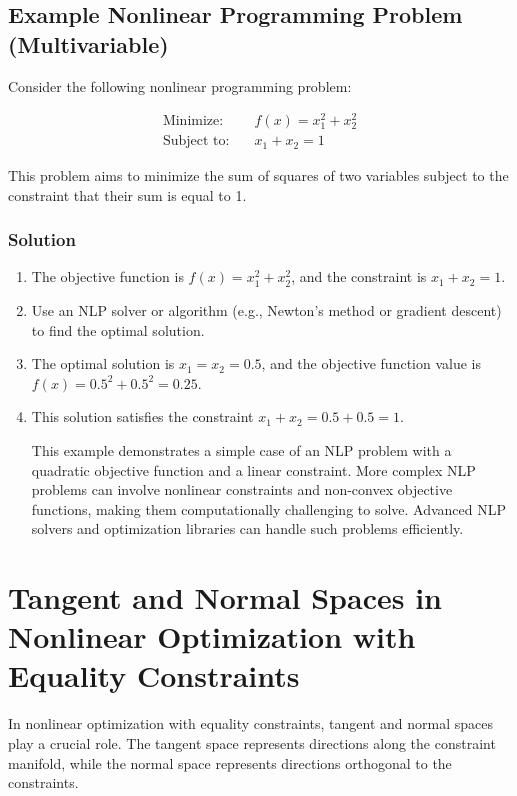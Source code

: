 \documentclass[a4paper]{article}
\begin{document}
\subsection{Example Nonlinear Programming Problem (Multivariable)}

Consider the following nonlinear programming problem:

\begin{align*}
\text{Minimize:} \quad & f(x) = x_1^2 + x_2^2 \\
\text{Subject to:} \quad & x_1 + x_2 = 1
\end{align*}

This problem aims to minimize the sum of squares of two variables subject to the constraint that their sum is equal to 1.

\subsubsection{Solution}

\begin{enumerate}
\item The objective function is \(f(x) = x_1^2 + x_2^2\), and the constraint is \(x_1 + x_2 = 1\).

\item Use an NLP solver or algorithm (e.g., Newton's method or gradient descent) to find the optimal solution.

\item The optimal solution is \(x_1 = x_2 = 0.5\), and the objective function value is \(f(x) = 0.5^2 + 0.5^2 = 0.25\).

\item This solution satisfies the constraint \(x_1 + x_2 = 0.5 + 0.5 = 1\).

This example demonstrates a simple case of an NLP problem with a quadratic objective function and a linear constraint. More complex NLP problems can involve nonlinear constraints and non-convex objective functions, making them computationally challenging to solve. Advanced NLP solvers and optimization libraries can handle such problems efficiently.
\end{enumerate}

\section{Tangent and Normal Spaces in Nonlinear Optimization with Equality Constraints}

In nonlinear optimization with equality constraints, tangent and normal spaces play a crucial role. The tangent space represents directions along the constraint manifold, while the normal space represents directions orthogonal to the constraints.
\end{document}
